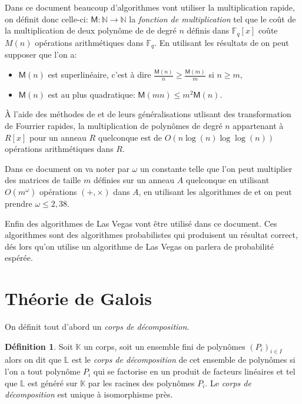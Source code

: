 \documentclass[10pt,a4paper]{book}
\theoremstyle{plain}
\theoremstyle{definition}
\theoremstyle{definition}
\theoremstyle{definition}
\theoremstyle{definition}
\newtheorem{defi}[thm]{Définition}
\theoremstyle{remark}
\theoremstyle{remark}
\theoremstyle{definition}
\begin{document}
Dans ce document beaucoup d'algorithmes vont utiliser la multiplication rapide, on définit donc celle-ci: $\mathsf{M}:\mathbb{N} \rightarrow \mathbb{N}$ la \emph{fonction de multiplication} tel que le coût de la multiplication de deux polynôme de de degré $n$ définis dans $\mathbb{F}_q[x]$ coûte $M(n)$ opérations arithmétiques dans $\mathbb{F}_q$. En utilisant les résultats de \cite[§8.3]{vzGJG03} on peut supposer que l'on a:
\begin{itemize}
\item $\mathsf{M}(n)$ est superlinéaire, c'est à dire $\frac{\mathsf{M}(n)}{n} \geqslant \frac{\mathsf{M}(m)}{m}$ si $n \geqslant m$,
\item $\mathsf{M}(n)$ est au plus quadratique: $\mathsf{M}(mn) \leqslant m^2 \mathsf{M}(n)$.
\end{itemize} 

\`A l'aide des méthodes de \cite{SchonhageStrassen71} et de leurs généralisations  \cite{Schonhage77} \cite{Cantor-Kaltofen91} utlisant des transformation de Fourrier rapides, la multiplication de polynômes de degré $n$ appartenant à $R[x]$ pour un anneau $R$ quelconque est de $O(n\log(n) \log \log (n))$ opérations arithmétiques dans $R$.

Dans ce document on va noter par $\omega$ un constante telle que l'on peut 
multiplier des matrices de taille $m$ définies sur un anneau $A$ quelconque en
utilisant $O(m^{\omega})$ opérations $(+,\times)$ dans $A$, en utilisant les 
algorithmes de \cite{CoppersmithWinograd90} et \cite{Williams12} on peut 
prendre $\omega \leqslant 2,38$.

Enfin des algorithmes de Las Vegas vont être utilisé dans ce document. Ces algorithmes sont des algorithmes probabilistes qui produisent un résultat correct, dés lors qu'on utilise un algorithme de Las Vegas on parlera de probabilité espérée.

\section{Théorie de Galois}

On définit tout d'abord un \emph{corps de décomposition}.
\begin{defi}
Soit $\mathbb{K}$ un corps, soit un ensemble fini de polynômes 
$(P_i)_{i \in I}$ alors on dit que $\mathbb{L}$ est le 
\emph{corps de décomposition} de cet ensemble de polynômes si l'on a tout polynôme
 $P_i$ qui se factorise en un produit de facteurs linéaires et tel que 
 $\mathbb{L}$ est généré sur $\mathbb{K}$ par les racines des polynômes $P_i$.
 Le \emph{corps de décomposition} est unique à isomorphisme près. 
\end{defi}
\end{document}
